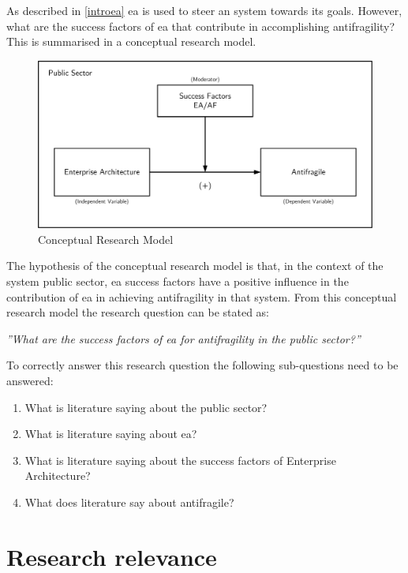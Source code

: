As described in \ref{introea} \acrshort{ea} is used to steer an system towards its goals. However, what are the success factors of \acrshort{ea} that contribute in accomplishing \gls{antifragility}? This is summarised in a conceptual research model.
\begin{figure}[H]
	\centering
	\includegraphics[width=0.8\linewidth]{images/conceptualmodel}
	\caption[Conceptual Research Model]{Conceptual Research Model}
	\label{fig:conceptualmodel}
\end{figure}

The hypothesis of the conceptual research model is that, in the context of the system public sector, \acrlong{ea} success factors have a positive influence in the contribution of \acrlong{ea} in achieving antifragility in that system. From this conceptual research model the research question can be stated as:\bigskip

\noindent \emph{''What are the success factors of \acrlong{ea} for \gls{antifragility} in the public sector?''}\bigskip

\noindent To correctly answer this research question the following sub-questions need to be answered:

\begin{enumerate}
	\item{What is literature saying about the public sector?}
	\item{What is literature saying about \acrlong{ea}?}
	\item{What is literature saying about the success factors of Enterprise Architecture?}
	\item{What does literature say about antifragile?}
\end{enumerate}
\section{Research relevance}
\label{sec:researchrelevance}

